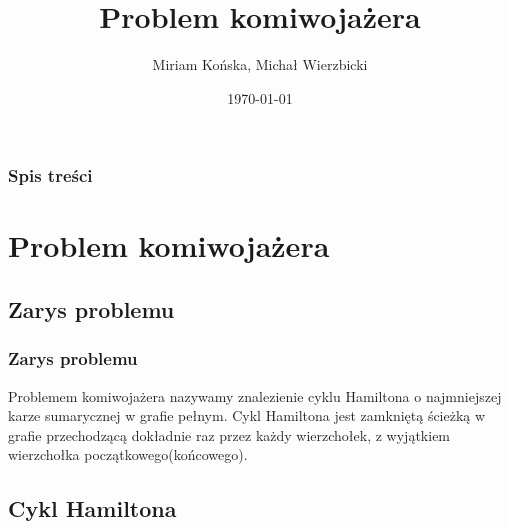 \documentclass{beamer}
\title[TSP ACU]{Problem komiwojażera} %
\author{Miriam Końska, Michał Wierzbicki} %
\institute[IIUWr] %
{
University of Wrocław \\ %
\medskip
}
\date{\today} %
\begin{document}
\begin{frame}
\titlepage %
\end{frame}

\begin{frame}
\frametitle{Spis treści} %
\tableofcontents %
\end{frame}


\section{Problem komiwojażera} %

\subsection{Zarys problemu} %


\begin{frame}
\frametitle{Zarys problemu}
Problemem komiwojażera nazywamy znalezienie cyklu Hamiltona o najmniejszej karze sumarycznej w grafie pełnym.
Cykl Hamiltona jest zamkniętą ścieżką w grafie przechodzącą dokładnie raz przez każdy wierzchołek, z wyjątkiem wierzchołka początkowego(końcowego).

\end{frame}


\subsection{Cykl Hamiltona}
\end{document}
